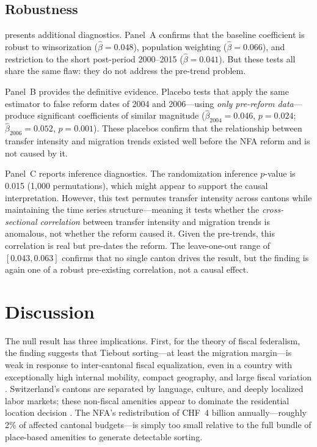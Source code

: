 \documentclass[12pt]{article}
\begin{document}


\subsection{Robustness}

 presents additional diagnostics. Panel~A confirms that the baseline coefficient is robust to winsorization ($\hat{\beta} = 0.048$), population weighting ($\hat{\beta} = 0.066$), and restriction to the short post-period 2000--2015 ($\hat{\beta} = 0.041$). But these tests all share the same flaw: they do not address the pre-trend problem.

Panel~B provides the definitive evidence. Placebo tests that apply the same estimator to false reform dates of 2004 and 2006---using \emph{only pre-reform data}---produce significant coefficients of similar magnitude ($\hat{\beta}_{2004} = 0.046$, $p = 0.024$; $\hat{\beta}_{2006} = 0.052$, $p = 0.001$). These placebos confirm that the relationship between transfer intensity and migration trends existed well before the NFA reform and is not caused by it.

Panel~C reports inference diagnostics. The randomization inference $p$-value is 0.015 (1,000 permutations), which might appear to support the causal interpretation. However, this test permutes transfer intensity across cantons while maintaining the time series structure---meaning it tests whether the \emph{cross-sectional correlation} between transfer intensity and migration trends is anomalous, not whether the reform caused it. Given the pre-trends, this correlation is real but pre-dates the reform. The leave-one-out range of $[0.043, 0.063]$ confirms that no single canton drives the result, but the finding is again one of a robust pre-existing correlation, not a causal effect.




\section{Discussion}
\label{sec:discussion}

The null result has three implications. First, for the theory of fiscal federalism, the finding suggests that Tiebout sorting---at least the migration margin---is weak in response to inter-cantonal fiscal equalization, even in a country with exceptionally high internal mobility, compact geography, and large fiscal variation \citep{tiebout1956pure, oates1972fiscal}. Switzerland's cantons are separated by language, culture, and deeply localized labor markets; these non-fiscal amenities appear to dominate the residential location decision \citep{brulhart2015does}. The NFA's redistribution of CHF~4 billion annually---roughly 2\% of affected cantonal budgets---is simply too small relative to the full bundle of place-based amenities to generate detectable sorting.
\end{document}
